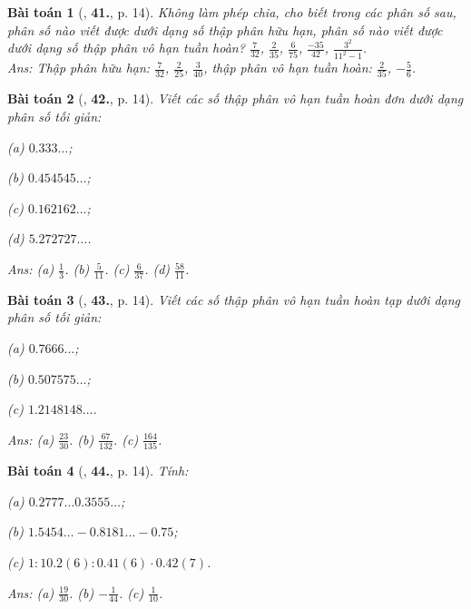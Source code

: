 \documentclass{article}
\numberwithin{equation}{section}
\newtheorem{baitoan}{Bài toán}
\begin{document}
\begin{baitoan}[\cite{Tuyen_Toan_7}, \textbf{41.}, p. 14]
	Không làm phép chia, cho biết trong các phân số sau, phân số nào viết được dưới dạng số thập phân hữu hạn, phân số nào viết được dưới dạng số thập phân vô hạn tuần hoàn? $\frac{7}{32}$, $\frac{2}{35}$, $\frac{6}{75}$, $\frac{-35}{42}$, $\frac{3^2}{11^2 - 1}$.\\\mbox{}\hfill\textsf{Ans:} Thập phân hữu hạn: $\frac{7}{32}$, $\frac{2}{25}$, $\frac{3}{40}$, thập phân vô hạn tuần hoàn: $\frac{2}{35}$, $-\frac{5}{6}$.
\end{baitoan}

\begin{baitoan}[\cite{Tuyen_Toan_7}, \textbf{42.}, p. 14]
	Viết các số thập phân vô hạn tuần hoàn đơn dưới dạng phân số tối giản:
	\begin{enumerate*}
		\item[(a)] $0.333\ldots$;
		\item[(b)] $0.454545\ldots$;
		\item[(c)] $0.162162\ldots$;
		\item[(d)] $5.272727\ldots$.
	\end{enumerate*}\hfill\textsf{Ans:} (a) $\frac{1}{3}$. (b) $\frac{5}{11}$. (c) $\frac{6}{37}$. (d) $\frac{58}{11}$.
\end{baitoan}

\begin{baitoan}[\cite{Tuyen_Toan_7}, \textbf{43.}, p. 14]
	Viết các số thập phân vô hạn tuần hoàn tạp dưới dạng phân số tối giản:
	\begin{enumerate*}
		\item[(a)] $0.7666\ldots$;
		\item[(b)] $0.507575\ldots$;
		\item[(c)] $1.2148148\ldots$.
	\end{enumerate*}\hfill\textsf{Ans:} (a) $\frac{23}{30}$. (b) $\frac{67}{132}$. (c) $\frac{164}{135}$.
\end{baitoan}

\begin{baitoan}[\cite{Tuyen_Toan_7}, \textbf{44.}, p. 14]
	Tính:\\
	\begin{enumerate*}
		\item[(a)] $0.2777\ldots 0.3555\ldots$;
		\item[(b)] $1.5454\ldots - 0.8181\ldots - 0.75$;
		\item[(c)] $1:10.2(6):0.41(6)\cdot 0.42(7)$.
	\end{enumerate*}\hfill\textsf{Ans:} (a) $\frac{19}{30}$. (b) $-\frac{1}{44}$. (c) $\frac{1}{10}$.
\end{baitoan}
\end{document}
